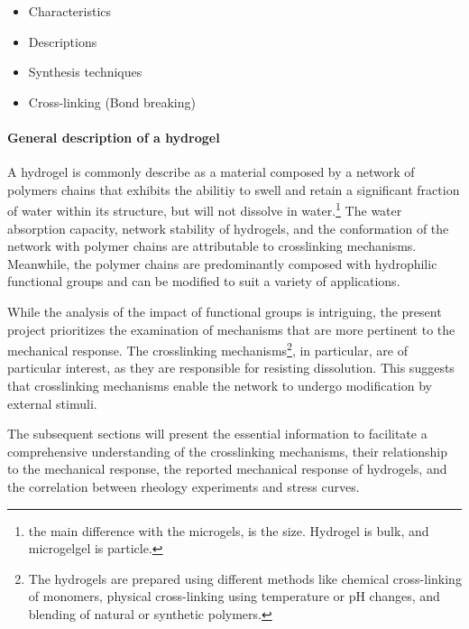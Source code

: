 \begin{itemize}
    \item Characteristics
    \item Descriptions 
    \item Synthesis techniques
    \item Cross-linking (Bond breaking)
\end{itemize}

\paragraph{General description of a hydrogel}
A hydrogel is commonly describe as a material composed by a network of polymers chains that exhibits the abilitiy to swell and retain a significant fraction of water within its structure, but will not dissolve in water\citep{ahmedHydrogelPreparationCharacterization2015a,ahmedHydrogelsMicrogelsDriving2025,priyaComprehensiveReviewHydrogel2024,bustamante-torresHydrogelsClassificationAccording2021}.\footnote{the main difference with the microgels, is the size. Hydrogel is bulk, and microgelgel is particle.}
The water absorption capacity, network stability of hydrogels, and the conformation of the network with polymer chains are attributable to crosslinking mechanisms\citep{priyaComprehensiveReviewHydrogel2024,ahmedHydrogelPreparationCharacterization2015a}.
Meanwhile, the polymer chains are predominantly composed with hydrophilic functional groups and can be modified to suit a variety of applications\citep{ahmedHydrogelPreparationCharacterization2015a,priyaComprehensiveReviewHydrogel2024,bustamante-torresHydrogelsClassificationAccording2021}.

While the analysis of the impact of functional groups is intriguing, the present project prioritizes the examination of mechanisms that are more pertinent to the mechanical response. 
The crosslinking mechanisms\footnote{The hydrogels are prepared using different methods like chemical cross-linking of monomers, physical cross-linking using temperature or pH changes, and blending of natural or synthetic polymers.}, in particular, are of particular interest, as they are responsible for resisting dissolution. 
This suggests that crosslinking mechanisms enable the network to undergo modification by external stimuli.

The subsequent sections will present the essential information to facilitate a comprehensive understanding of the crosslinking mechanisms, their relationship to the mechanical response, the reported mechanical response of hydrogels, and the correlation between rheology experiments and stress curves.

